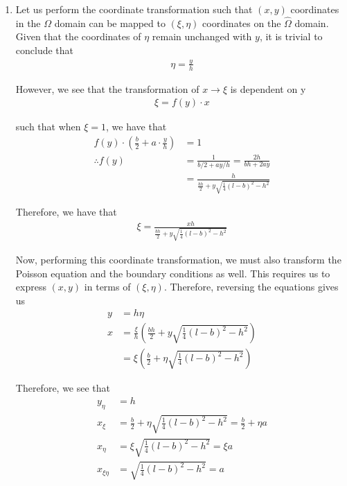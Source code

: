 \begin{enumerate}[label=(\roman*),leftmargin=*,itemsep=0mm]
    
    \item Let us perform the coordinate transformation such that $(x,y)$ coordinates in the $\Omega$ domain can be mapped to $(\xi,\eta)$ coordinates on the $\hat{\Omega}$ domain.  Given that the coordinates of $\eta$ remain unchanged with $y$, it is trivial to conclude that
    \begin{align}
        \eta = \frac{y}{h}
    \end{align}
    
    However, we see that the transformation of $x\rightarrow\xi$ is dependent on y
    \begin{align*}
        \xi = f(y) \cdot x
    \end{align*}
    
    such that when $\xi=1$, we have that
    \begin{align*}
        f(y) \cdot \left(\frac{b}{2} + a\cdot\frac{y}{h} \right) &= 1 \\
        \therefore f(y) &= \frac{1}{b/2 + ay/h} = \frac{2h}{bh + 2ay} \\
        &= \frac{h}{\frac{bh}{2} + y\sqrt{\frac{1}{4}(l-b)^2-h^2}}
    \end{align*}
    
    Therefore, we have that
    \begin{align}
        \xi = \frac{xh}{\frac{bh}{2} + y\sqrt{\frac{1}{4}(l-b)^2-h^2}}
    \end{align}
    
    Now, performing this coordinate transformation, we must also transform the Poisson equation and the boundary conditions as well. This requires us to express $(x,y)$ in terms of $(\xi,\eta)$.  Therefore, reversing the equations gives us
    \begin{align}
        y &= h\eta \\
        x &= \frac{\xi}{h}\left( \frac{bh}{2} + y\sqrt{\frac{1}{4}(l-b)^2-h^2} \right) \nonumber \\
        &= \xi \left(\frac{b}{2} + \eta\sqrt{\frac{1}{4}(l-b)^2-h^2} \right)
    \end{align}
    
    Therefore, we see that
    \begin{align}
        y_\eta &= h \label{yeta}\\
        x_\xi  &= \frac{b}{2} + \eta\sqrt{\frac{1}{4}(l-b)^2-h^2} = \frac{b}{2} + \eta a\\
        x_\eta &= \xi\sqrt{\frac{1}{4}(l-b)^2-h^2} = \xi a \\
        x_{\xi\eta} &= \sqrt{\frac{1}{4}(l-b)^2-h^2} = a \label{xxieta}
    \end{align}
    

\end{enumerate}
